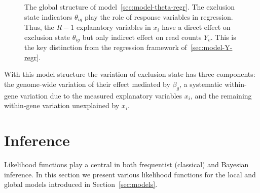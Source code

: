 \documentclass[letterpaper]{article}
\begin{document}
\begin{figure}[t]
\begin{center}
\end{center}
\caption{
The global structure of model~\ref{sec:model-theta-regr}.  The exclusion state
indicators \(\theta_{ig}\) play the role of response variables in regression.
Thus, the \(R-1\) explanatory variables in \(x_i\) have a direct effect on
exclusion state \(\theta_{ig}\) but only indirect effect on read counts
\(Y_v\).  This is the key distinction from the regression framework
of~\ref{sec:model-Y-regr}.
}
\label{fig:theta-regression}
\end{figure}

With this model structure the variation of exclusion state has three
components: the genome-wide variation of their effect mediated by \(\beta_g\),
a systematic within-gene variation due to the measured explanatory variables
\(x_i\), and the remaining within-gene variation unexplained by \(x_i\).

\renewcommand{\thesubsection}{\arabic{section}.\arabic{subsection}}
\section{Inference}
\label{sec:likelihood}

Likelihood functions play a central in both frequentist (classical) and
Bayesian inference.  In this section we present various likelihood functions
for the local and global models introduced in Section~\ref{sec:models}.
\end{document}
